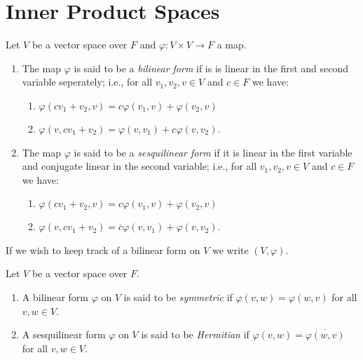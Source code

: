 \section{Inner Product Spaces}
    \begin{definition}
        Let $V$ be a vector space over $F$ and $\varphi:V \times V \rightarrow F$ a map.
            \begin{enumerate}[label = (\arabic*)]
                \item The map $\varphi$ is said to be a \textit{bilinear form} if is is linear in the first and second variable seperately; i.e., for all $v_1,v_2,v \in V$ and $c \in F$ we have:
                    \begin{enumerate}[label = (\roman*)]
                        \item $\varphi(cv_1 +v_2,v) = c\varphi(v_1,v) + \varphi(v_2,v)$
                        \item $\varphi(v,cv_1 + v_2) = \varphi(v,v_1) + c\varphi(v,v_2)$.
                    \end{enumerate}

                \item The map $\varphi$ is said to be a \textit{sesquilinear form} if it is linear in the first variable and conjugate linear in the second variable; i.e., for all $v_1,v_2,v \in V$ and $c \in F$ we have:
                    \begin{enumerate}[label = (\roman*)]
                        \item $\varphi(cv_1 +v_2,v) = c\varphi(v_1,v) + \varphi(v_2,v)$
                        \item $\varphi(v,cv_1 + v_2) = \overline{c}\varphi(v,v_1) + \varphi(v,v_2)$.
                    \end{enumerate}
            \end{enumerate}
        If we wish to keep track of a bilinear form on $V$ we write $(V,\varphi)$.
    \end{definition}

    \begin{definition}
        Let $V$ be a vector space over $F$.
            \begin{enumerate}[label = (\arabic*)]
                \item A bilinear form $\varphi$ on $V$ is said to be \textit{symmetric} if $\varphi(v,w) = \varphi(w,v)$ for all $v,w \in V$.
                \item A sesquilinear form $\varphi$ on $V$ is said to be \textit{Hermitian} if $\varphi(v,w) = \overline{\varphi(w,v)}$ for all $v,w \in V$.
            \end{enumerate}
    \end{definition}

